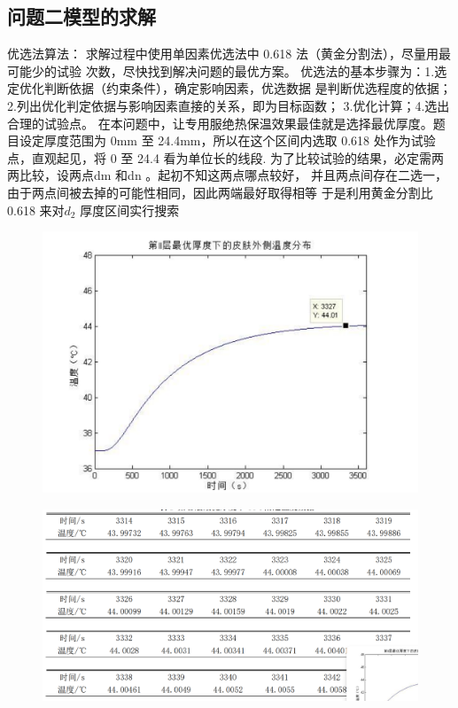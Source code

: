 \documentclass{article}
\begin{document}
	\subsection{问题二模型的求解}
	优选法算法： 
	求解过程中使用单因素优选法中 0.618 法（黄金分割法），尽量用最可能少的试验
	次数，尽快找到解决问题的最优方案。 
	优选法的基本步骤为：1.选定优化判断依据（约束条件），确定影响因素，优选数据
	是判断优选程度的依据；2.列出优化判定依据与影响因素直接的关系，即为目标函数；
	3.优化计算；4.选出合理的试验点。 
	在本问题中，让专用服绝热保温效果最佳就是选择最优厚度。题目设定厚度范围为
	0mm 至 24.4mm，所以在这个区间内选取 0.618 处作为试验点，直观起见，将 0 至 24.4
	看为单位长的线段.
	为了比较试验的结果，必定需两两比较，设两点dm 和dn 。起初不知这两点哪点较好，
	并且两点间存在二选一，由于两点间被去掉的可能性相同，因此两端最好取得相等
	于是利用黄金分割比 0.618 来对$d_{2}$ 厚度区间实行搜索
	
	\begin{figure}[htbp]
		\centering
		\includegraphics[scale=0.4]{屏幕截图 2024-07-15 223012.png}
	\end{figure}
	
	\begin{figure}[htbp]
		\centering
		\includegraphics[scale=0.4]{屏幕截图 2024-07-15 223019.png}
	\end{figure}
	
\end{document}
